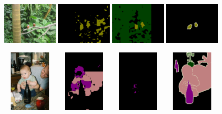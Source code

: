\begin{figure}[tbhp!]
  {\includegraphics[width=0.24\textwidth]{figures/experiments/pascal/image/0075.jpg}}
  {\includegraphics[width=0.24\textwidth]{figures/experiments/pascal/orgckpt/0075.png}}
  {\includegraphics[width=0.24\textwidth]{figures/experiments/pascal/nonnoisybaseline/0075.png}}
  {\includegraphics[width=0.24\textwidth]{figures/experiments/pascal/gt/2007_002412.png}}
  
    {\includegraphics[width=0.24\textwidth, height=3cm]{figures/experiments/pascal/image/0042.jpg}}
  {\includegraphics[width=0.24\textwidth, height=3cm]{figures/experiments/pascal/orgckpt/0042.png}}
  {\includegraphics[width=0.24\textwidth, height=3cm]{figures/experiments/pascal/nonnoisybaseline/0042.png}}
  {\includegraphics[width=0.24\textwidth, height=3cm]{figures/experiments/pascal/gt/2007_001408.png}}


\end{figure}
